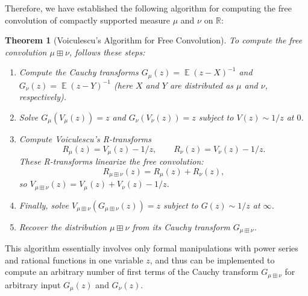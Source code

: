 \documentclass[letterpaper,11pt,oneside,reqno]{amsart}
\numberwithin{equation}{section}
\newcommand{\lect}[1]{}
\DeclareMathOperator{\EE}{\mathbb{E}}
\newtheorem{theorem}[proposition]{Theorem}
\theoremstyle{definition}
\begin{document}
Therefore, we have established the following algorithm for computing the free convolution
of compactly supported measure $\mu$ and $\nu$ on $\mathbb{R}$:
\begin{theorem}[Voiculescu's Algorithm for Free Convolution]\label{thm:Voiculescu_algorithm}
To compute the free convolution $\mu\boxplus\nu$, follows these steps:
\begin{enumerate}
    \item Compute the Cauchy transforms $G_\mu(z)=\EE (z-X)^{-1}$ and $G_\nu(z)=\EE (z-Y)^{-1}$
    (here $X$ and $Y$ are distributed as $\mu$ and $\nu$, respectively).
    \item Solve $G_\mu(V_\mu(z))=z$ and $G_\nu(V_\nu(z))=z$ subject to $V(z)\sim 1/z$ at $0$.
    \item Compute Voiculescu's R-transforms
    \begin{equation*}
        R_\mu(z)=V_\mu(z)-1/z,\qquad R_\nu(z)=V_\nu(z)-1/z.
    \end{equation*}
    These R-transforms linearize the free convolution: 
    \begin{equation*}
    	R_{\mu\boxplus\nu}(z)=R_\mu(z)+R_\nu(z),
    \end{equation*}
    so $V_{\mu\boxplus\nu}(z)=V_\mu(z)+V_\nu(z)-1/z$.
    \item Finally, solve $V_{\mu\boxplus\nu}(G_{\mu\boxplus\nu}(z))=z$ subject to $G(z)\sim 1/z$ at $\infty$.
    \item Recover the distribution $\mu\boxplus\nu$ from its Cauchy transform $G_{\mu\boxplus\nu}$.
\end{enumerate}
\end{theorem}
This algorithm essentially involves only formal manipulations with 
power series and rational functions in one variable $z$, and 
thus can be implemented to compute an arbitrary number of first 
terms of the Cauchy transform $G_{\mu\boxplus\nu}$
for arbitrary input $G_\mu(z)$ and $G_\nu(z)$.

\lect{2/8/2016}
\end{document}
